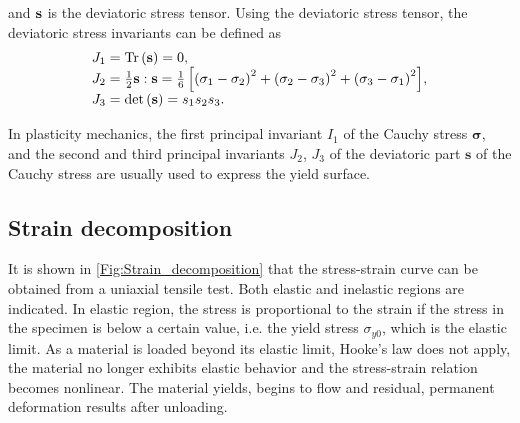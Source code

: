 and $\bf{s}$ is the deviatoric stress tensor.
Using the deviatoric stress tensor, the deviatoric stress invariants can be defined as
\begin{equation}
\begin{array}{*{20}{l}}
{{J_1} = {\rm{Tr}}\left( {\bf{s}} \right) = 0},\\
{{J_2} = \frac{1}{2}{\bf{s}}:{\bf{s}} = \frac{1}{6}\left[ {{{\left( {{\sigma _1} - {\sigma _2}} \right)}^2} + {{\left( {{\sigma _2} - {\sigma _3}} \right)}^2} + {{\left( {{\sigma _3} - {\sigma _1}} \right)}^2}} \right]},\\
{{J_3} = \det \left( {\bf{s}} \right) = {s_1}{s_2}{s_3}}.
\end{array}
\end{equation}

In plasticity mechanics, the first principal invariant $I_1$ of the Cauchy stress $\boldsymbol{\sigma}$, and the second and third principal invariants $J_2$, $J_3$ of the deviatoric part $\boldsymbol{s}$ of the Cauchy stress are usually used to express the yield surface.


\subsection{Strain decomposition}
\noindent
It is shown in \ref{Fig:Strain_decomposition} that the stress-strain curve can be obtained from a uniaxial tensile test.
Both elastic and inelastic regions are indicated.
In elastic region, the stress is proportional to the strain if the stress in the specimen is below a certain value, i.e. the yield stress $\sigma_{y0}$, which is the elastic limit.
As a material is loaded beyond its elastic limit, Hooke's law does not apply, the material no longer exhibits elastic behavior and the stress-strain relation becomes nonlinear. The material yields, begins to flow and residual, permanent deformation results after unloading.

